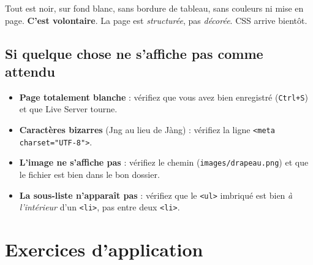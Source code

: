 \documentclass[11pt,a4paper]{article}
\begin{document}
\bigskip

\begin{retenirbox}
Tout est noir, sur fond blanc, sans bordure de tableau, sans couleurs ni
mise en page. \textbf{C'est volontaire}. La page est \emph{structurée}, pas
\emph{décorée}. CSS arrive bientôt.
\end{retenirbox}

\subsection{Si quelque chose ne s'affiche pas comme attendu}

\begin{itemize}[leftmargin=*,nosep]
    \item \textbf{Page totalement blanche} : vérifiez que vous avez bien enregistré (\texttt{Ctrl+S}) et que Live Server tourne.
    \item \textbf{Caractères bizarres} (Jng au lieu de Jàng) : vérifiez la ligne \texttt{<meta charset="UTF-8">}.
    \item \textbf{L'image ne s'affiche pas} : vérifiez le chemin (\texttt{images/drapeau.png}) et que le fichier est bien dans le bon dossier.
    \item \textbf{La sous-liste n'apparaît pas} : vérifiez que le \texttt{<ul>} imbriqué est bien \emph{à l'intérieur} d'un \texttt{<li>}, pas entre deux \texttt{<li>}.
\end{itemize}

\newpage

\section{Exercices d'application}
\end{document}
